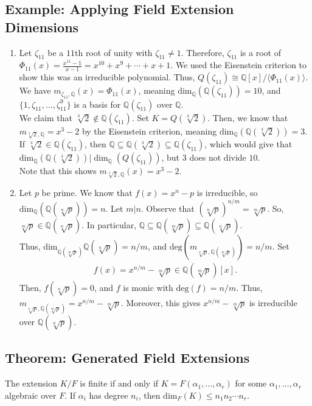 \documentclass[10pt]{extarticle}
\newcommand{\Q}{\mathbb{Q}}
\begin{document}
  \subsection{Example: Applying Field Extension Dimensions}%
  \begin{enumerate}[(1)]
    \item Let $\zeta_{11}$ be a $11$th root of unity with $\zeta_{11} \neq 1$. Therefore, $\zeta_{11}$ is a root of $\Phi_{11}(x) = \frac{x^{11}-1}{x-1} = x^{10} + x^9 + \cdots + x + 1$. We used the Eisenstein criterion to show this was an irreducible polynomial. Thus, $Q(\zeta_{11}) \cong \Q[x]/\langle \Phi_{11}(x)\rangle$. We have $m_{\zeta_{11},\Q}(x) = \Phi_{11}(x)$, meaning $\text{dim}_{\Q}(\Q(\zeta_{11})) = 10$, and $\{1,\zeta_{11},\dots,\zeta_{11}^{9}\}$ is a basis for $\Q(\zeta_{11})$ over $\Q$.\\

      We claim that $\sqrt[3]{2}\notin \Q(\zeta_{11})$. Set $K = Q(\sqrt[3]{2})$. Then, we know that $m_{\sqrt[3]{2},\Q} = x^{3}-2$ by the Eisenstein criterion, meaning $\text{dim}_{\Q}(\Q(\sqrt[3]{2})) = 3$. If $\sqrt[3]{2}\in \Q(\zeta_{11})$, then $\Q\subseteq \Q(\sqrt[3]{2})\subseteq \Q(\zeta_{11})$, which would give that $\text{dim}_{\Q}(\Q(\sqrt[3]{2}))|\dim_{\Q}(Q(\zeta_{11}))$, but $3$ does not divide $10$.\\

      Note that this shows $m_{\sqrt[3]{2},\Q}(x) = x^3-2$.
    \item Let $p$ be prime. We know that $f(x) = x^{n}-p$ is irreducible, so $\text{dim}_{\Q}\left(\Q(\sqrt[n]{p})\right) = n$. Let $m|n$. Observe that $\left(\sqrt[n]{p}\right)^{n/m} = \sqrt[m]{p}$. So, $\sqrt[m]{p}\in \Q(\sqrt[n]{p})$. In particular, $\Q\subseteq \Q(\sqrt[m]{p})\subseteq \Q(\sqrt[n]{p})$.\\

      Thus, $\text{dim}_{\Q(\sqrt[m]{p})}\Q(\sqrt[n]{p}) = n/m$, and $\text{deg}(m_{\sqrt[n]{p},\Q(\sqrt[m]{p})}) = n/m$. Set
      \begin{align*}
        f(x) = x^{n/m}-\sqrt[m]{p} \in \Q(\sqrt[m]{p})[x].
      \end{align*}
      Then, $f(\sqrt[n]{p}) = 0$, and $f$ is monic with $\text{deg}(f) = n/m$. Thus, $m_{\sqrt[n]{p},\Q(\sqrt[m]{p})} = x^{n/m}-\sqrt[m]{p}$. Moreover, this gives $x^{n/m}-\sqrt[m]{p}$ is irreducible over $\Q(\sqrt[n]{p})$.
  \end{enumerate}
  \subsection{Theorem: Generated Field Extensions}%
  The extension $K/F$ is finite if and only if $K = F(\alpha_1,\dots,\alpha_r)$ for some $\alpha_1,\dots,\alpha_r$ algebraic over $F$. If $\alpha_i$ has degree $n_i$, then $\text{dim}_{F}(K)\leq n_1n_2\cdots n_r$.\\
\end{document}
